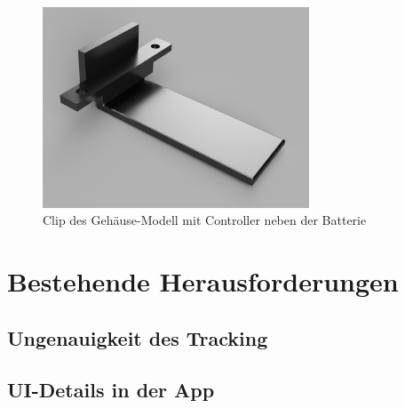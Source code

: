 \begin{figure}[htbp]
	\includegraphics[width=300px]{images/case/low_clip.png}
	\centering
	\caption{Clip des Gehäuse-Modell mit Controller neben der Batterie}
	\label{fig:case-low-clip}
\end{figure}

\section{Bestehende Herausforderungen}
\subsection{Ungenauigkeit des Tracking}

\subsection{UI-Details in der App}
